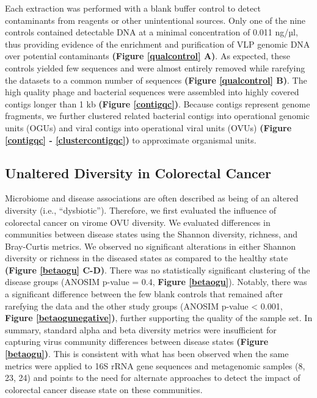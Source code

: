 \documentclass[12pt,]{article}
\begin{document}
Each extraction was performed with a blank buffer control to detect
contaminants from reagents or other unintentional sources. Only one of
the nine controls contained detectable DNA at a minimal concentration of
0.011 ng/µl, thus providing evidence of the enrichment and purification
of VLP genomic DNA over potential contaminants \textbf{(Figure
\ref{qualcontrol} A)}. As expected, these controls yielded few sequences
and were almost entirely removed while rarefying the datasets to a
common number of sequences \textbf{(Figure \ref{qualcontrol} B)}. The
high quality phage and bacterial sequences were assembled into highly
covered contigs longer than 1 kb \textbf{(Figure \ref{contigqc})}.
Because contigs represent genome fragments, we further clustered related
bacterial contigs into operational genomic units (OGUs) and viral
contigs into operational viral units (OVUs) \textbf{(Figure
\ref{contigqc} - \ref{clustercontigqc})} to approximate organismal
units.

\subsection{Unaltered Diversity in Colorectal
Cancer}\label{unaltered-diversity-in-colorectal-cancer}

Microbiome and disease associations are often described as being of an
altered diversity (i.e., ``dysbiotic''). Therefore, we first evaluated
the influence of colorectal cancer on virome OVU diversity. We evaluated
differences in communities between disease states using the Shannon
diversity, richness, and Bray-Curtis metrics. We observed no significant
alterations in either Shannon diversity or richness in the diseased
states as compared to the healthy state \textbf{(Figure \ref{betaogu}
C-D)}. There was no statistically significant clustering of the disease
groups (ANOSIM p-value = 0.4, \textbf{Figure \ref{betaogu}}). Notably,
there was a significant difference between the few blank controls that
remained after rarefying the data and the other study groups (ANOSIM
p-value \textless{} 0.001, \textbf{Figure \ref{betaogunegative})},
further supporting the quality of the sample set. In summary, standard
alpha and beta diversity metrics were insufficient for capturing virus
community differences between disease states \textbf{(Figure
\ref{betaogu})}. This is consistent with what has been observed when the
same metrics were applied to 16S rRNA gene sequences and metagenomic
samples (8, 23, 24) and points to the need for alternate approaches to
detect the impact of colorectal cancer disease state on these
communities.
\end{document}
